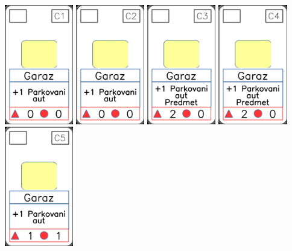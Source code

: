 \documentclass[a4paper]{article}
\begin{document}
	\includegraphics[width=3.0cm]{img-2_10}
	\includegraphics[width=3.0cm]{img-2_11}
	\includegraphics[width=3.0cm]{img-2_12}
	\includegraphics[width=3.0cm]{img-2_13}
	\includegraphics[width=3.0cm]{img-2_14}
\end{document}
